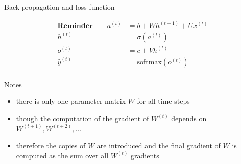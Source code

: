 \begin{frame}{Back-propagation and loss function}
{\begin{overlayarea}{0.65\textwidth}{8cm}
{%
{\scriptsize
\begin{align*}
\textbf{Reminder} \qquad a^{(t)} & = b + Wh^{(t-1)} + Ux^{(t)}\\
h^{(t)} & = \sigma(a^{(t)})\\
o^{(t)} & = c + Vh^{(t)}\\
\hat{y}^{(t)} & = \text{softmax}(o^{(t)})\\
\end{align*}}
}

\end{overlayarea}}
\end{frame}

\begin{frame}[beamer:0]{Notes}
\begin{itemize}
\item there is only one parameter matrix $W$ for all time steps
\item though the computation of the gradient of $W^{(t)}$ depends on $W^{(t+1)}, W^{(t+2)}, \ldots$
\item therefore the copies of $W$ are introduced and the final gradient of $W$ is computed as the sum over all $W^{(t)}$ gradients
\end{itemize}
\end{frame}

